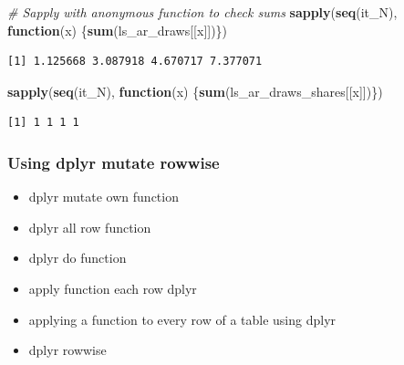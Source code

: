 \documentclass[
]{book}
\newenvironment{Shaded}{\begin{snugshade}}{\end{snugshade}}
\newcommand{\CommentTok}[1]{\textcolor[rgb]{0.56,0.35,0.01}{\textit{#1}}}
\newcommand{\ControlFlowTok}[1]{\textcolor[rgb]{0.13,0.29,0.53}{\textbf{#1}}}
\newcommand{\KeywordTok}[1]{\textcolor[rgb]{0.13,0.29,0.53}{\textbf{#1}}}
\newcommand{\NormalTok}[1]{#1}
\newcommand{\OperatorTok}[1]{\textcolor[rgb]{0.81,0.36,0.00}{\textbf{#1}}}
\newcommand{\StringTok}[1]{\textcolor[rgb]{0.31,0.60,0.02}{#1}}
\providecommand{\tightlist}{%
  \setlength{\itemsep}{0pt}\setlength{\parskip}{0pt}}
\begin{document}
\begin{Shaded}
\begin{Highlighting}[]
\CommentTok{# Sapply with anonymous function to check sums}
\KeywordTok{sapply}\NormalTok{(}\KeywordTok{seq}\NormalTok{(it_N), }\ControlFlowTok{function}\NormalTok{(x) \{}\KeywordTok{sum}\NormalTok{(ls_ar_draws[[x]])\})}
\end{Highlighting}
\end{Shaded}

\begin{verbatim}
[1] 1.125668 3.087918 4.670717 7.377071
\end{verbatim}

\begin{Shaded}
\begin{Highlighting}[]
\KeywordTok{sapply}\NormalTok{(}\KeywordTok{seq}\NormalTok{(it_N), }\ControlFlowTok{function}\NormalTok{(x) \{}\KeywordTok{sum}\NormalTok{(ls_ar_draws_shares[[x]])\})}
\end{Highlighting}
\end{Shaded}

\begin{verbatim}
[1] 1 1 1 1
\end{verbatim}

\hypertarget{using-dplyr-mutate-rowwise}{%
\subsubsection{Using dplyr mutate rowwise}\label{using-dplyr-mutate-rowwise}}

\begin{itemize}
\tightlist
\item
  dplyr mutate own function
\item
  dplyr all row function
\item
  dplyr do function
\item
  apply function each row dplyr
\item
  applying a function to every row of a table using dplyr
\item
  dplyr rowwise
\end{itemize}

\begin{Shaded}
\end{Shaded}
\end{document}
